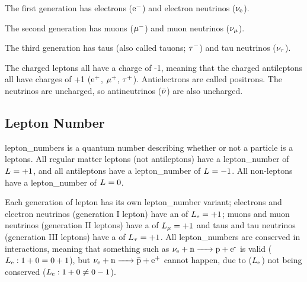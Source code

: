         The first generation has \glspl{electron} ($\electron[-]$) and electron \glspl{neutrino} ($\neutrino[e]$).

        The second generation has \glspl{muon} ($\muon[-]$) and muon \glspl{neutrino} ($\neutrino[\mu]$).

        The third generation has \glspl{tau} (also called tauons; $\taulepton[-]$) and tau \glspl{neutrino} ($\neutrino[\tau]$).

        The charged \glspl{lepton} all have a charge of -1, meaning that the charged \glspl{antilepton} all have charges of +1 ($\electron[+]$, $\muon[+]$, $\taulepton[+]$).
        Antielectrons are called \glspl{positron}.
        The \glspl{neutrino} are uncharged, so \glspl{antineutrino} ($\antineutrino[]$) are also uncharged.

        \subsection{Lepton Number}
            \Glspl{lepton_number} is a quantum number describing whether or not a particle is a \glspl{lepton}.
            All regular matter \glspl{lepton} (not \glspl{antilepton}) have a \gls{lepton_number} of $\leptonnumber[]=+1$, and all \glspl{antilepton} have a \gls{lepton_number} of $\leptonnumber[]=-1$.
            All non-\glspl{lepton} have a \gls{lepton_number} of $\leptonnumber[]=0$.

            Each generation of \gls{lepton} has its own \gls{lepton_number} variant; \glspl{electron} and electron \glspl{neutrino} (generation I \gls{lepton}) have an  of $\leptonnumber[e]=+1$; \glspl{muon} and muon \glspl{neutrino} (generation II \glspl{lepton}) have a  of $\leptonnumber[\mu]=+1$ and \glspl{tau} and tau \glspl{neutrino} (generation III leptons) have a  of $\leptonnumber[\tau]=+1$.
            All \glspl{lepton_number} are conserved in interactions, meaning that something such as $\ce{{\neutrino[e]} + {\neutron} -> {\proton} + {\electron[-]}}$ is valid ($\leptonnumber[e]:1+0=0+1$), but $\ce{{\neutrino[e]} + {\neutron} -> {\antiproton} + {\electron[+]}}$ cannot happen, due to  ($\leptonnumber[e]$) not being conserved ($\leptonnumber[e]:1+0\neq0-1$).
        
